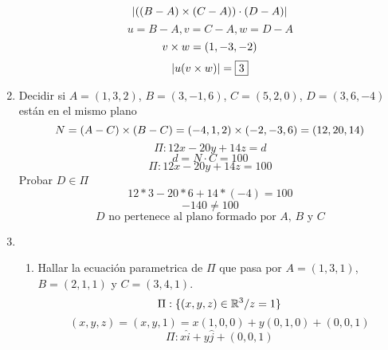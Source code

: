 \documentclass[../practica.root.tex]{subfiles}
\begin{document}
\begin{enumerate}
          \[ | ((B-A)\times(C-A))\cdot(D-A) | \]
          \[ u = B - A, v = C - A, w = D - A \]
          \[ v\times w = (1, -3, -2) \]
          \[ | u(v \times w) | = \boxed{3} \]

    \item Decidir si $A = (1,3,2)$, $B = (3,-1,6)$, $C = (5,2,0)$, $D = (3,6,-4)$ están en el mismo plano
          \[ N = (A-C) \times (B-C) = (-4,1,2) \times (-2,-3,6) = (12,20,14) \]
          \[ \Pi: 12x - 20y + 14z = d \]
          \[ d = N \cdot C = 100 \]
          \[ \Pi: 12x - 20y + 14z = 100 \]
          Probar $D \in \Pi$
          \[ 12*3 - 20*6 + 14*(-4) = 100 \]
          \[ -140 \neq 100 \]
          \[ \boxed{\text{$D$ no pertenece al plano formado por $A$, $B$ y $C$}} \]


    \item \begin{enumerate}
              \item Hallar la ecuación parametrica de $\Pi$ que pasa por $A = (1, 3, 1)$, $B = (2, 1, 1)$ y $C = (3, 4, 1)$.
                    \[ \Pi : \{(x, y, z) \in \mathbb{R}^3 / z = 1\} \]
                    \[ (x, y, z) = (x, y, 1) = x(1, 0, 0) + y(0, 1, 0) + (0, 0, 1) \]
                    \[ \boxed{\Pi : x\hat{i} + y\hat{j} + (0, 0, 1)} \]


\end{enumerate}
\end{enumerate}
\end{document}
